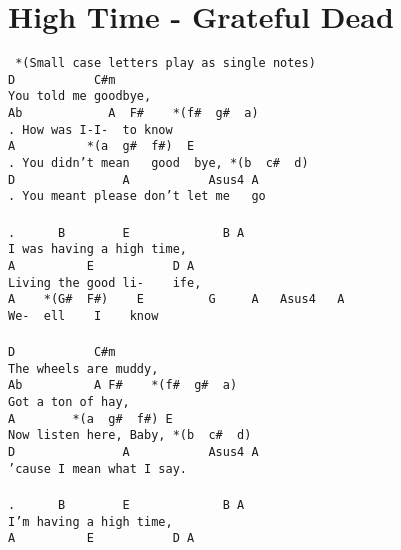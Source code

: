 \newpage
\section{High Time - Grateful Dead}
\label{High Time - Grateful Dead}
\texttt{ *(Small\ case\ letters\ play\ as\ single\ notes)\ \ \\
D\ \ \ \ \ \ \ \ \ \ \ C\#m\\
You\ told\ me\ goodbye,\\
Ab\ \ \ \ \ \ \ \ \ \ \ \ A\ \ F\#\ \ \ \ *(f\#\ \ g\#\ \ a)\ \\
. How\ was\ I-I-\ \ to\ know\\
A\ \ \ \ \ \ \ \ \ \ *(a\ \ g\#\ \ f\#)\ \ E\ \ \ \ \ \ \\
. You\ didn't\ mean\ \ \ good\ \ bye,\ *(b\ \ c\#\ \ d)\\
D\ \ \ \ \ \ \ \ \ \ \ \ \ \ \ A\ \ \ \ \ \ \ \ \ \ \ Asus4\ A\\
. You\ meant\ please\ don't\ let\ me\ \ \ go\\
\\
. \ \ \ \ \ B\ \ \ \ \ \ \ \ E\ \ \ \ \ \ \ \ \ \ \ \ \ B\ A\\
I\ was\ having\ a\ high\ time,\\
A\ \ \ \ \ \ \ \ \ \ E\ \ \ \ \ \ \ \ \ \ \ D\ A\\
Living\ the\ good\ li-\ \ \ \ ife,\\
A\ \ \ \ *(G\#\ \ F\#)\ \ \ \ E\ \ \ \ \ \ \ \ \ G\ \ \ \ \ A\ \ \ Asus4\ \ \ A\\
We-\ \ ell\ \ \ \ I\ \ \ \ know\\
\\
D\ \ \ \ \ \ \ \ \ \ \ C\#m\\
The\ wheels\ are\ muddy,\\
Ab\ \ \ \ \ \ \ \ \ \ A\ F\#\ \ \ \ *(f\#\ \ g\#\ \ a)\\
Got\ a\ ton\ of\ hay,\\
A\ \ \ \ \ \ \ \ *(a\ \ g\#\ \ f\#)\ E\ \ \ \ \ \ \\
Now\ listen\ here,\ Baby,\ *(b\ \ c\#\ \ d)\\
D\ \ \ \ \ \ \ \ \ \ \ \ \ \ \ A\ \ \ \ \ \ \ \ \ \ \ Asus4\ A\\
'cause\ I\ mean\ what\ I\ say.\\
\\
. \ \ \ \ \ B\ \ \ \ \ \ \ \ E\ \ \ \ \ \ \ \ \ \ \ \ \ B\ A\\
I'm\ having\ a\ high\ time,\\
A\ \ \ \ \ \ \ \ \ \ E\ \ \ \ \ \ \ \ \ \ \ D\ A\\
}
